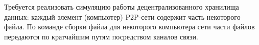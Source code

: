 Требуется реализовать симуляцию работы децентрализованного хранилища данных: каждый элемент (компьютер) P2P-сети содержит часть некоторого файла. По команде сборки файла для некоторого компьютера сети части файлов передаются по кратчайшим путям посредством каналов связи.